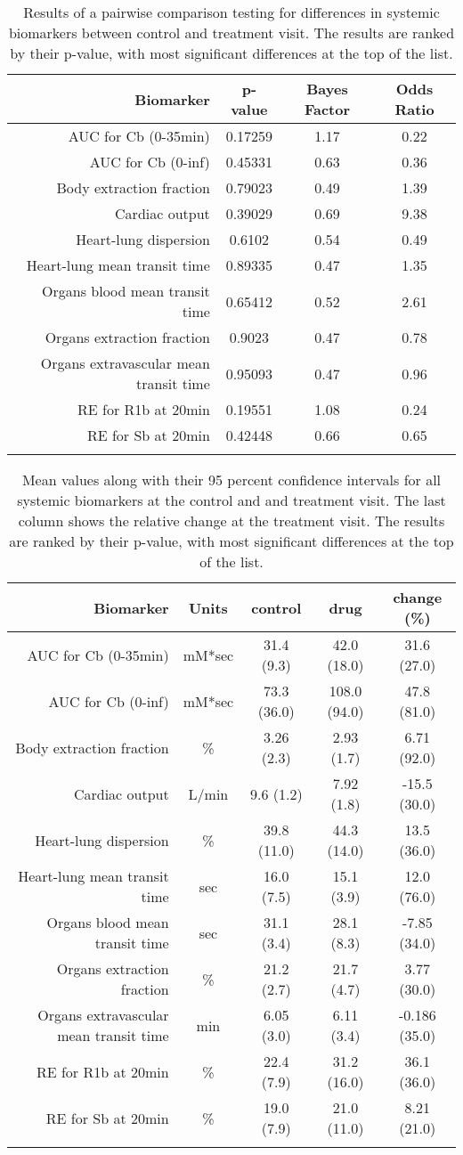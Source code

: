 \documentclass{epflreport}%
\begin{document}
%
\begin{longtable}{rccc}%
\hline%
Biomarker&p{-}value&Bayes Factor&Odds Ratio\\%
\hline%
AUC for Cb (0{-}35min)&0.17259&1.17&0.22\\%
AUC for Cb (0{-}inf)&0.45331&0.63&0.36\\%
Body extraction fraction&0.79023&0.49&1.39\\%
Cardiac output&0.39029&0.69&9.38\\%
Heart{-}lung dispersion&0.6102&0.54&0.49\\%
Heart{-}lung mean transit time&0.89335&0.47&1.35\\%
Organs blood mean transit time&0.65412&0.52&2.61\\%
Organs extraction fraction&0.9023&0.47&0.78\\%
Organs extravascular mean transit time&0.95093&0.47&0.96\\%
RE for R1b at 20min&0.19551&1.08&0.24\\%
RE for Sb at 20min&0.42448&0.66&0.65\\%
\hline%
\caption{Results of a pairwise comparison testing for differences in systemic biomarkers between control and treatment visit. The results are ranked by their p-value, with most significant differences at the top of the list.} \\%
\end{longtable}%
\begin{longtable}{rcccc}%
\hline%
Biomarker&Units&control&drug&change (\%)\\%
\hline%
AUC for Cb (0{-}35min)&mM*sec&31.4 (9.3) &42.0 (18.0) &31.6 (27.0) \\%
AUC for Cb (0{-}inf)&mM*sec&73.3 (36.0) &108.0 (94.0) &47.8 (81.0) \\%
Body extraction fraction&\%&3.26 (2.3) &2.93 (1.7) &6.71 (92.0) \\%
Cardiac output&L/min&9.6 (1.2) &7.92 (1.8) &{-}15.5 (30.0) \\%
Heart{-}lung dispersion&\%&39.8 (11.0) &44.3 (14.0) &13.5 (36.0) \\%
Heart{-}lung mean transit time&sec&16.0 (7.5) &15.1 (3.9) &12.0 (76.0) \\%
Organs blood mean transit time&sec&31.1 (3.4) &28.1 (8.3) &{-}7.85 (34.0) \\%
Organs extraction fraction&\%&21.2 (2.7) &21.7 (4.7) &3.77 (30.0) \\%
Organs extravascular mean transit time&min&6.05 (3.0) &6.11 (3.4) &{-}0.186 (35.0) \\%
RE for R1b at 20min&\%&22.4 (7.9) &31.2 (16.0) &36.1 (36.0) \\%
RE for Sb at 20min&\%&19.0 (7.9) &21.0 (11.0) &8.21 (21.0) \\%
\hline%
\caption{Mean values along with their 95 percent confidence intervals for all systemic biomarkers at the control and and treatment visit. The last column shows the relative change at the treatment visit. The results are ranked by their p-value, with most significant differences at the top of the list.} \\%
\end{longtable}%
\clearpage%
\end{document}
